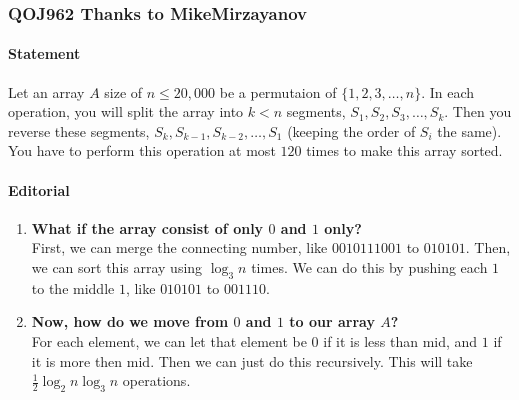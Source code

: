 \subsubsection{QOJ962 Thanks to MikeMirzayanov}


\paragraph{Statement}
Let an array $A$ size of $n \le 20,000$ be a permutaion of $\{1, 2, 3, \dots, n\}$.
In each operation, you will split the array into $k < n$ segments, $S_1, S_2, S_3, \dots, S_k$.
Then you reverse these segments, $S_k, S_{k-1}, S_{k-2}, \dots, S_1$ (keeping the order of $S_i$ the same).
You have to perform this operation at most $120$ times to make this array sorted.

\paragraph{Editorial}
\begin{enumerate}
    \item \textbf{What if the array consist of only $0$ and $1$ only?} \\
    First, we can merge the connecting number, like $0010111001$ to $010101$.
    Then, we can sort this array using $\log_{3}n$ times.
    We can do this by pushing each $1$ to the middle $1$, like $010101$ to $001110$.
    \item \textbf{Now, how do we move from $0$ and $1$ to our array $A$?} \\
    For each element, we can let that element be $0$ if it is less than $\text{mid}$, and $1$ if it is more then $\text{mid}$.
    Then we can just do this recursively.
    This will take $\frac{1}{2}\log_2n\log_3n$ operations.
\end{enumerate}

